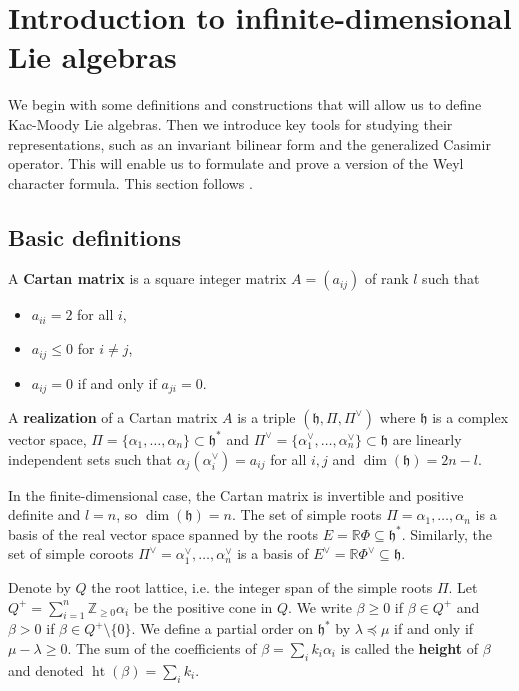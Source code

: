 \documentclass[12pt]{article}
\begin{document}
\section{Introduction to infinite-dimensional Lie algebras}
We begin with some definitions and constructions that will allow us to define Kac-Moody Lie algebras. Then we introduce key tools for studying their representations, such as an invariant bilinear form and the generalized Casimir operator. This will enable us to formulate and prove a version of the Weyl character formula.
This section follows \cite{kac}.
\subsection{Basic definitions}
\begin{definition}
    A \textbf{Cartan matrix} is a square integer matrix $A = (a_{ij})$ of rank $l$ such that
    \begin{itemize}
        \item $a_{ii} = 2$ for all $i$,
        \item $a_{ij} \leq 0$ for $i \neq j$,
        \item $a_{ij} = 0$ if and only if $a_{ji} = 0$.
    \end{itemize}
    A \textbf{realization} of a Cartan matrix $A$ is a triple $(\mathfrak{h}, \Pi, \Pi^\vee)$ where $\mathfrak{h}$ is a complex vector space, $\Pi = \{\alpha_1, \dots, \alpha_n\} \subset \mathfrak{h}^*$ and $\Pi^\vee = \{\alpha_1^\vee, \dots, \alpha_n^\vee\} \subset \mathfrak{h}$ are linearly independent sets such that $\alpha_j(\alpha_i^\vee) = a_{ij}$ for all $i,j$ and $\dim(\mathfrak{h}) = 2n - l$.
\end{definition}

\begin{remark}
    In the finite-dimensional case, the Cartan matrix is invertible and positive definite and $l = n$, so $\dim(\mathfrak{h}) = n$. The set of simple roots $\Pi = {\alpha_1, \dots, \alpha_n}$ is a basis of the real vector space spanned by the roots $E = \mathbb{R}\Phi \subseteq \mathfrak{h}^*$. Similarly, the set of simple coroots $\Pi^\vee = {\alpha_1^\vee, \dots, \alpha_n^\vee}$ is a basis of $E^\vee = \mathbb{R}\Phi^\vee \subseteq \mathfrak{h}$.
\end{remark}

Denote by $Q$ the root lattice, i.e. the integer span of the simple roots $\Pi$. Let $Q^+ = \sum_{i=1}^n \mathbb{Z}_{\geq 0} \alpha_i$ be the positive cone in $Q$. We write $\beta \geq 0$ if $\beta \in Q^+$ and $\beta > 0$ if $\beta \in Q^+ \setminus \{0\}$. We define a partial order on $\mathfrak{h}^*$ by $\lambda \preceq \mu$ if and only if $\mu - \lambda \geq 0$. The sum of the coefficients of $\beta = \sum_i k_i \alpha_i$ is called the \textbf{height} of $\beta$ and denoted $\operatorname{ht}(\beta) = \sum_i k_i$.
\end{document}
